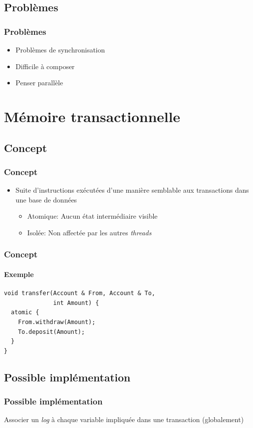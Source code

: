 \documentclass{beamer}
\begin{document}
\subsection{Problèmes}
\begin{frame}
\frametitle{Problèmes}
\begin{itemize}
\item Problèmes de synchronisation
\item Difficile à composer
\item Penser parallèle
\end{itemize}
\end{frame}

\section{Mémoire transactionnelle}
\subsection{Concept}
\begin{frame}
\frametitle{Concept}
\begin{itemize}
\item Suite d'instructions exécutées d'une manière semblable aux transactions dans une base de données
\begin{itemize}
\item<2-> Atomique: Aucun état intermédiaire visible
\item<3-> Isolée: Non affectée par les autres \textit{threads}
\end{itemize}
\end{itemize}
\end{frame}

\begin{frame}[fragile]
\frametitle{Concept}
\framesubtitle{Exemple}
\begin{lstlisting}
void transfer(Account & From, Account & To, 
              int Amount) {
  atomic {
    From.withdraw(Amount);
    To.deposit(Amount);
  }
}
\end{lstlisting}
\end{frame}

\subsection{Possible implémentation}
\begin{frame}
\frametitle{Possible implémentation}
\begin{algorithm}[H]
 Associer un \textit{log} à chaque variable impliquée dans une transaction (globalement)\;
\end{algorithm}
\end{frame}
\end{document}

